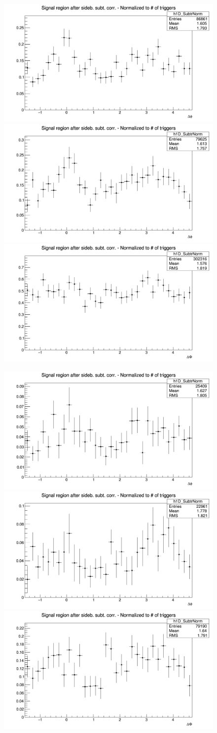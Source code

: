 \begin{figure}[htbp]
{\includegraphics[width=0.31\linewidth, height=0.23\linewidth]{figures/Dzero/AzimCorrDistr_Dzero_Canvas_PtIntBins4to5_PoolInt_thr2dotto99dot.png}}
{\includegraphics[width=0.31\linewidth, height=0.23\linewidth]{figures/DplusPlotsweff/AzimCorrDistr_Dplus_Canvas_PtIntBins3to4_PoolInt_thr2dotto99dot.png}}
{\includegraphics[width=0.31\linewidth, height=0.23\linewidth]{figures/Dstar_wEFF/AzimCorrDistr_Dstar_Canvas_PtIntBins2to3_PoolInt_thr2dotto99dot.png}}

{\includegraphics[width=0.31\linewidth, height=0.23\linewidth]{figures/Dzero/AzimCorrDistr_Dzero_Canvas_PtIntBins4to5_PoolInt_thr3dotto99dot.png}}
{\includegraphics[width=0.31\linewidth, height=0.23\linewidth]{figures/DplusPlotsweff/AzimCorrDistr_Dplus_Canvas_PtIntBins3to4_PoolInt_thr3dotto99dot.png}}
{\includegraphics[width=0.31\linewidth, height=0.23\linewidth]{figures/Dstar_wEFF/AzimCorrDistr_Dstar_Canvas_PtIntBins2to3_PoolInt_thr3dotto99dot.png}}

\end{figure}

